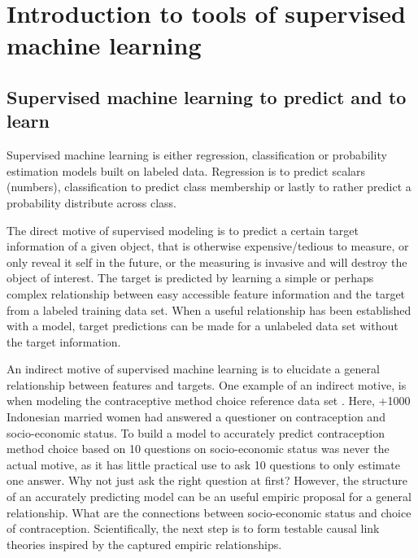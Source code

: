 \chapter{Introduction to tools of supervised machine learning}

\section{Supervised machine learning to predict and to learn}
Supervised machine learning is either regression, classification or probability estimation models built on labeled data. Regression is to predict scalars (numbers), classification to predict class membership or lastly to rather predict a probability distribute across class. 

The direct motive of supervised modeling is to predict a certain target information of a given object, that is otherwise expensive/tedious to measure, or only reveal it self in the future, or the measuring is invasive and will destroy the object of interest. The target is predicted by learning a simple or perhaps complex relationship between easy accessible feature information and the target from a labeled training data set. When a useful relationship has been established with a model, target predictions can be made for a unlabeled data set without the target information.

An indirect motive of supervised machine learning is to elucidate a general relationship between features and targets. One example of an indirect motive, is when modeling the contraceptive method choice reference data set \cite{welling2016forest,lichman2013uci}. Here, +1000 Indonesian married women had answered a questioner on contraception and socio-economic status. To build a model to accurately predict contraception method choice based on 10 questions on socio-economic status was never the actual motive, as it has little practical use to ask 10 questions to only estimate one answer. Why not just ask the right question at first? However, the structure of an accurately predicting model can be an useful empiric proposal for a general relationship. What are the connections between socio-economic status and choice of contraception. Scientifically, the next step is to form testable causal link theories inspired by the captured empiric relationships.

